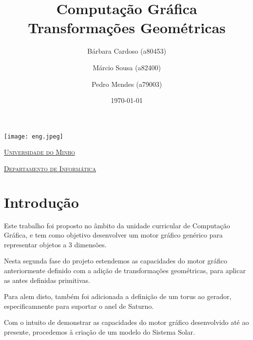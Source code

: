 \documentclass[a4paper]{article}
\begin{document}
\title{Computação Gráfica\\ Transformações Geométricas}
\author{Bárbara Cardoso (a80453) \and Márcio Sousa (a82400) \and Pedro Mendes (a79003)}
\date{\today}

\begin{titlepage}

    \thispagestyle{empty}
    \begin{center}
        \begin{minipage}{0.75\linewidth}
            \centering
            \texttt{[image: eng.jpeg]}\par\vspace{1cm}
            \vspace{1.5cm}
            \href{https://www.uminho.pt/PT}{\scshape\LARGE Universidade do Minho} \par
            \vspace{1cm}
            \href{https://www.di.uminho.pt/}{\scshape\Large Departamento de Informática} \par
            \vspace{1.5cm}

            \maketitle
        \end{minipage}
    \end{center}

\end{titlepage}

\tableofcontents

\pagebreak

\section{Introdução}
Este trabalho foi proposto no âmbito da unidade curricular de Computação Gráfica, e tem como objetivo desenvolver um motor gráfico genérico para representar objetos a 3 dimensões.

Nesta segunda fase do projeto estendemos as capacidades do motor gráfico anteriormente definido com a adição de transformações geométricas, para aplicar as antes definidas primitivas.

Para alem disto, também foi adicionada a definição de um torus ao gerador, especificamnente para suportar o anel de Saturno.

Com o intuito de demonstrar as capacidades do motor gráfico desenvolvido até ao presente, procedemos à criação de um modelo do Sistema Solar.
\end{document}
